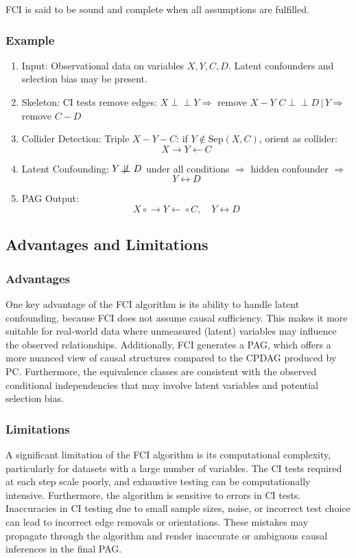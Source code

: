 \documentclass[main.tex]{subfiles}
\begin{document}
FCI is said to be sound and complete when all assumptions are fulfilled.

\subsubsection{Example}

\begin{enumerate}
  \item Input:
  Observational data on variables \( X, Y, C, D \). Latent confounders and selection bias may be present.

  \item Skeleton: 
  CI tests remove edges:  
  \( X \perp\!\!\!\perp Y \Rightarrow \) remove \( X - Y \)  
  \( C \perp\!\!\!\perp D \,|\, Y \Rightarrow \) remove \( C - D \)

  \item Collider Detection:
  Triple \( X - Y - C \): if \( Y \notin \text{Sep}(X, C) \), orient as collider:  
  \[
    X \rightarrow Y \leftarrow C
  \]

  \item Latent Confounding: 
  \( Y \not\!\perp\!\!\!\perp D \) under all conditions $\Rightarrow$ hidden confounder $\Rightarrow$
  \[
    Y \leftrightarrow D
  \]

  \item PAG Output: 
  \[
    X \circ\!\!\rightarrow Y \leftarrow\!\!\circ C,\quad Y \leftrightarrow D
  \]
\end{enumerate}




\subsection{Advantages and Limitations}
\subsubsection*{Advantages}
One key advantage of the FCI algorithm is its ability to handle latent confounding, because FCI does not assume causal sufficiency. This makes it more suitable for real-world data where unmeasured (latent) variables may influence the observed relationships. Additionally, FCI generates a PAG, which offers a more nuanced view of causal structures compared to the CPDAG produced by PC. Furthermore, the equivalence classes are consistent with the observed conditional independencies that may involve latent variables and potential selection bias.

\subsubsection*{Limitations}
A significant limitation of the FCI algorithm is its computational complexity, particularly for datasets with a large number of variables. The CI tests required at each step scale poorly, and exhaustive testing can be computationally intensive. Furthermore, the algorithm is sensitive to errors in CI tests. Inaccuracies in CI testing due to small sample sizes, noise, or incorrect test choice can lead to incorrect edge removals or orientations. These mistakes may propagate through the algorithm and render inaccurate or ambiguous causal inferences in the final PAG.
\end{document}
